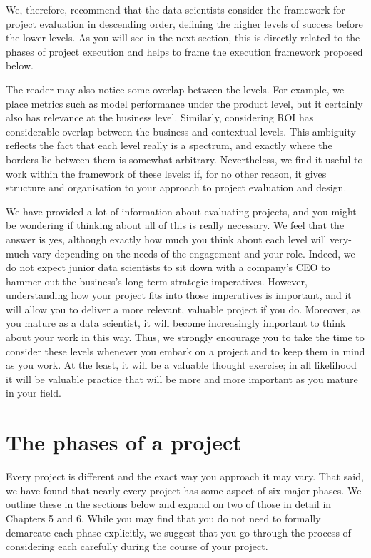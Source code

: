\documentclass[
]{book}
\begin{document}
We, therefore, recommend that the data scientists consider the framework for project evaluation in descending order, defining the higher levels of success before the lower levels. As you will see in the next section, this is directly related to the phases of project execution and helps to frame the execution framework proposed below.

The reader may also notice some overlap between the levels. For example, we place metrics such as model performance under the product level, but it certainly also has relevance at the business level. Similarly, considering ROI has considerable overlap between the business and contextual levels. This ambiguity reflects the fact that each level really is a spectrum, and exactly where the borders lie between them is somewhat arbitrary. Nevertheless, we find it useful to work within the framework of these levels: if, for no other reason, it gives structure and organisation to your approach to project evaluation and design.

We have provided a lot of information about evaluating projects, and you might be wondering if thinking about all of this is really necessary. We feel that the answer is yes, although exactly how much you think about each level will very-much vary depending on the needs of the engagement and your role. Indeed, we do not expect junior data scientists to sit down with a company's CEO to hammer out the business's long-term strategic imperatives. However, understanding how your project fits into those imperatives is important, and it will allow you to deliver a more relevant, valuable project if you do. Moreover, as you mature as a data scientist, it will become increasingly important to think about your work in this way. Thus, we strongly encourage you to take the time to consider these levels whenever you embark on a project and to keep them in mind as you work. At the least, it will be a valuable thought exercise; in all likelihood it will be valuable practice that will be more and more important as you mature in your field.

\hypertarget{phases}{%
\chapter{The phases of a project}\label{phases}}

Every project is different and the exact way you approach it may vary. That said, we have found that nearly every project has some aspect of six major phases. We outline these in the sections below and expand on two of those in detail in Chapters 5 and 6. While you may find that you do not need to formally demarcate each phase explicitly, we suggest that you go through the process of considering each carefully during the course of your project.
\end{document}
